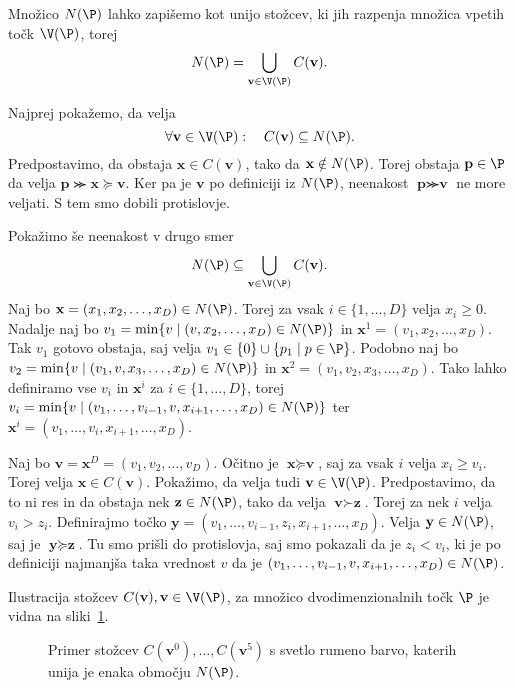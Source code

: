 \begin{trditev}
\label{trditev:unija-stozcev}
Množico $N(\P)$ lahko zapišemo kot unijo stožcev, ki jih razpenja množica vpetih točk $\V(\P)$, torej
\[
N(\P) = \bigcup_{\textbf{v} \in \V(\P)} C(\textbf{v}).
\]
\end{trditev}
\begin{dokaz}
Najprej pokažemo, da velja 
\[
\forall \textbf{v} \in \V(\P): \quad C(\textbf{v}) \subseteq N(\P).
\]
Predpostavimo, da obstaja $\textbf{x} \in C(\textbf{v})$, tako da $\textbf{x} \notin N(\P)$. Torej obstaja $\textbf{p} \in \P$ da velja $\textbf{p} \ggcurly \textbf{x} \succeq \textbf{v}$. Ker pa je $\textbf{v}$ po definiciji iz $N(\P)$, neenakost $\textbf{p} \ggcurly \textbf{v}$ ne more veljati. S tem smo dobili protislovje.

Pokažimo še neenakost v drugo smer 
\[
N(\P) \subseteq \bigcup_{\textbf{v} \in \V(\P)} C(\textbf{v}).
\]
Naj bo $\textbf{x} = (x_1, x_2, \dots, x_D) \in N(\P)$. Torej za vsak $i \in \{1, \dots, D\}$ velja $x_i \geq 0$. Nadalje naj bo $v_1 = \min \{v \mid (v, x_2, \dots, x_D) \in N(\P) \}$ in $\textbf{x}^1 = (v_1, x_2, \dots, x_D)$. Tak $v_1$ gotovo obstaja, saj velja $v_1 \in \{0\} \cup \{p_1 \mid p \in \P\}$. Podobno naj bo $v_2 = \min \{v \mid (v_1, v, x_3, \dots, x_D) \in N(\P) \}$ in $\textbf{x}^2 = (v_1, v_2, x_3, \dots, x_D)$. Tako lahko definiramo vse $v_i$ in $\textbf{x}^i$ za $i \in \{1, \dots, D\}$, torej $v_i = \min \{v \mid (v_1, \dots, v_{i-1}, v, x_{i+1}, \dots, x_D) \in N(\P) \}$ ter $\textbf{x}^i = (v_1, \dots, v_i, x_{i+1}, \dots, x_D)$.

Naj bo $\textbf{v} = \textbf{x}^D = (v_1, v_2,\dots, v_D)$. Očitno je $\textbf{x} \succeq \textbf{v}$, saj za vsak $i$ velja $x_i \geq v_i$. Torej velja $\textbf{x} \in C(\textbf{v})$. Pokažimo, da velja tudi $\textbf{v} \in \V(\P)$. Predpostavimo, da to ni res in da obstaja nek $\textbf{z} \in N(\P)$, tako da velja $\textbf{v} \succ \textbf{z}$. Torej za nek $i$ velja $v_i > z_i$. Definirajmo točko $\textbf{y} = (v_1, \dots, v_{i-1}, z_i, x_{i+1}, \dots, x_D)$. Velja $\textbf{y} \in N(\P)$, saj je $\textbf{y} \succeq \textbf{z}$. Tu smo prišli do protislovja, saj smo pokazali da je $z_i < v_i$, ki je po definiciji najmanjša taka vrednost $v$ da je $(v_1, \dots, v_{i-1}, v, x_{i+1}, \dots, x_D) \in N(\P)$.
\end{dokaz}

Ilustracija stožcev $C(\textbf{v}), \textbf{v} \in \V(\P)$, za množico dvodimenzionalnih točk $\P$ je vidna na sliki~\ref{fig:cones}.
\begin{figure}[ht]
  \centering
  
  \caption{Primer stožcev $C(\textbf{v}^0), \dots, C(\textbf{v}^5)$ s svetlo rumeno barvo, katerih unija je enaka območju $N(\P)$.}
  \label{fig:cones}
\end{figure}



